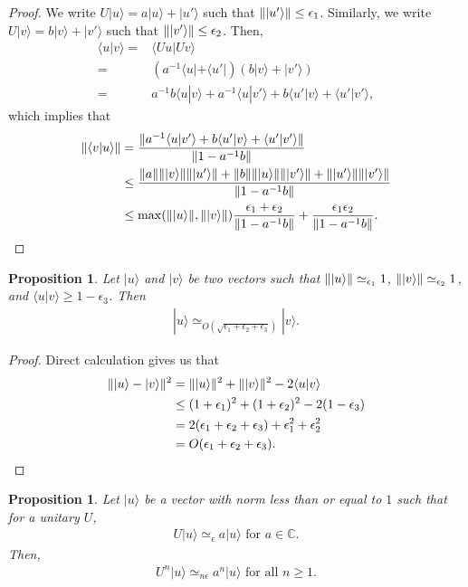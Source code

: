 \documentclass[11pt,letterpaper]{article}
\newcommand{\ket}[1]{|#1\rangle}
\newcommand{\bra}[1]{\langle#1|}
\newcommand{\braket}[2]{\langle#1|#2\rangle}
\DeclarePairedDelimiter{\norm}{\lVert}{\rVert}
\newcommand{\C}{\mathbb{C}}
\newcommand{\1}{\mathbb{1}}
\newcommand{\ep}{\epsilon}
\newcommand{\appd}[1]{\simeq_{#1}}
\newtheorem{proposition}[theorem]{Proposition}
\theoremstyle{definition}
\begin{document}
\begin{proof}
	We write $U\ket{u} = a\ket{u} + \ket{u'}$ such that $\norm{\ket{u'}} \leq \ep_1$.
	Similarly, we write $U\ket{v} = b\ket{v} + \ket{v'}$ such that $\norm{\ket{v'}} \leq \ep_2$.
	Then,
	\begin{align*}
		\braket{u}{v} =& \braket{Uu}{Uv} \\
		=& (a^{-1}\bra{u}+\bra{u'})(b\ket{v}+\ket{v'})\\
		=& a^{-1}b \braket{u}{v} + a^{-1}\braket{u}{v'}
		+ b \braket{u'}{v} + \braket{u'}{v'},
	\end{align*}
	which implies that 
	\begin{align*}
		\norm{\braket{v}{u}} &= \frac{\norm{a^{-1}\braket{u}{v'} +  b\braket{u'}{v}+ \braket{u'}{v'}}}{\norm{1 - a^{-1}b}} \\
		&\leq \frac{\norm{a}\norm{\ket{v}}\norm{\ket{u'}}+
		\norm{b}\norm{\ket{u}}\norm{\ket{v'}} + 
		\norm{\ket{u'}}\norm{\ket{v'}}}{\norm{1 - a^{-1}b}} \\
		&\leq \max(\norm{\ket{u}}, \norm{\ket{v}})\frac{\ep_1+\ep_2}{\norm{1-a^{-1}b}}
		+ \frac{\ep_1\ep_2}{\norm{1-a^{-1}b}}.
	\end{align*}
\end{proof}
\begin{proposition}
\label{prop:close_vec}
	Let $\ket{u}$ and $\ket{v}$ be two vectors such that $\norm{\ket{u}} \appd{\ep_1} 1$,
	$\norm{\ket{v}} \appd{\ep_2} 1$, and $\braket{u}{v} \geq 1 - \ep_3$.
	Then
	\begin{align*}
		\ket{u} \appd{O(\sqrt{\ep_1+\ep_2+\ep_3})} \ket{v}.
	\end{align*}
\end{proposition}
\begin{proof}
	Direct calculation gives us that
	\begin{align*}
		\norm{\ket{u} - \ket{v}}^2 &= \norm{\ket{u}}^2 + \norm{\ket{v}}^2 - 2\braket{u}{v} \\
		&\leq (1+\ep_1)^2 + (1+\ep_2)^2 - 2(1 - \ep_3)\\
		&= 2(\ep_1+\ep_2+\ep_3)+ \ep_1^2 + \ep_2^2\\
		& = O(\ep_1+\ep_2+\ep_3).
	\end{align*}
\end{proof}
\begin{proposition}
	Let $\ket{u}$ be a vector with norm less than or equal to $1$ such that for a unitary $U$,
	\begin{align*}
		U\ket{u} \appd{\ep} a\ket{u} \text{ for } a \in \C.
	\end{align*}
	Then,
	\begin{align*}
		U^n \ket{u} \appd{n\ep} a^n \ket{u} \text{ for all } n \geq 1.
	\end{align*}
\end{proposition}
\end{document}
